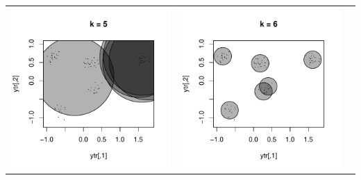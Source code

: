 \documentclass{beamer}
\begin{document}
\begin{frame}
\begin{center}
\begin{tabular}{ccc}
\includegraphics[scale = \scalesize, clip = true, trim = 0.3in 0.4in 0.3in 0.2in]{../conformal_kmeans/k5.pdf} &
\includegraphics[scale = \scalesize, clip = true, trim = 0.3in 0.4in 0.3in 0.2in]{../conformal_kmeans/k6.pdf} \\

\end{tabular}
\end{center}
\end{frame}
\end{document}
